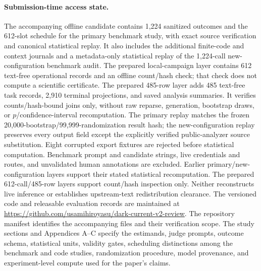 \documentclass[10pt]{article}
\begin{document}
\paragraph{Submission-time access state.}
The accompanying offline candidate contains 1,224 sanitized outcomes and the 612-slot schedule for the primary benchmark study, with exact source verification and canonical statistical replay. It also includes the additional finite-code and context journals and a metadata-only statistical replay of the 1,224-call new-configuration benchmark audit. The prepared local-campaign layer contains 612 text-free operational records and an offline count/hash check; that check does not compute a scientific certificate. The prepared 485-row layer adds 485 text-free task records, 2,910 terminal projections, and saved analysis summaries. It verifies counts/hash-bound joins only, without raw reparse, generation, bootstrap draws, or $p$/confidence-interval recomputation. The primary replay matches the frozen 20,000-bootstrap/99,999-randomization result hash; the new-configuration replay preserves every output field except the explicitly verified public-analyzer source substitution. Eight corrupted export fixtures are rejected before statistical computation. Benchmark prompt and candidate strings, live credentials and routes, and unvalidated human annotations are excluded. Earlier primary/new-configuration layers support their stated statistical recomputation. The prepared 612-call/485-row layers support count/hash inspection only. Neither reconstructs live inference or establishes upstream-text redistribution clearance. The versioned code and releasable evaluation records are maintained at \url{https://github.com/usamihiroyasu/dark-current-v2-review}. The repository manifest identifies the accompanying files and their verification scope. The study sections and Appendices A--C specify the estimands, judge prompts, outcome schema, statistical units, validity gates, scheduling distinctions among the benchmark and code studies, randomization procedure, model provenance, and experiment-level compute used for the paper's claims.
\end{document}

